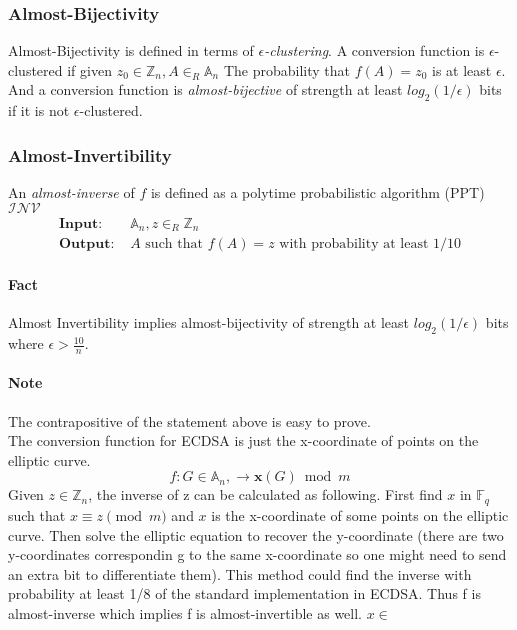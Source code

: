 \documentclass[12]{article}
\begin{document}
\subsubsection{Almost-Bijectivity}
Almost-Bijectivity is defined in terms of \textit{$\epsilon$-clustering}.
A conversion function is $\epsilon$-clustered if given
$z_0 \in \mathbb{Z}_n, A \in _R \mathbb{A}_n$
The probability that
$f(A)=z_0$ is at least $\epsilon$. And a conversion function is \textit{almost-bijective} of strength at least $log_2(1/\epsilon)$ bits if  it is not $\epsilon$-clustered.
\subsubsection{Almost-Invertibility}
An \textit{almost-inverse} of $f$ is defined as a polytime probabilistic
algorithm (PPT) $\mathcal{INV}$
\begin{align*}
\textbf{Input: } &\mathbb{A}_n, z \in _R \mathbb{Z}_n \\
\textbf{Output: } &A \text{ such that } f(A)=z
\text{ with probability at least } 1/10
\end{align*}
\paragraph{Fact} Almost Invertibility implies almost-bijectivity of strength at least
$log_2(1/\epsilon)$ bits where $\epsilon > \frac{10}{n}$.
\paragraph{Note} The contrapositive of the statement above is easy to prove.
\\
The conversion function for ECDSA is just the x-coordinate of points on the elliptic curve.
\begin{equation*}
f: G \in \mathbb{A}_n, \to \mathbf{x}(G) \bmod m
\end{equation*}
Given $z \in \mathbb{Z}_n$, the inverse of z can be calculated as following.
First find $x$ in $\mathbb{F}_q$ such that $x \equiv z \pmod{m}$ and $x$ is the x-coordinate of some points on the elliptic curve. Then solve the elliptic equation to recover the y-coordinate (there are two y-coordinates correspondin g to the same x-coordinate so one might need to send an extra bit to differentiate them).
This method could find the inverse with probability at least 1/8 of the standard implementation in ECDSA. Thus f is almost-inverse which implies f is almost-invertible as well.
$x \in $
\end{document}
